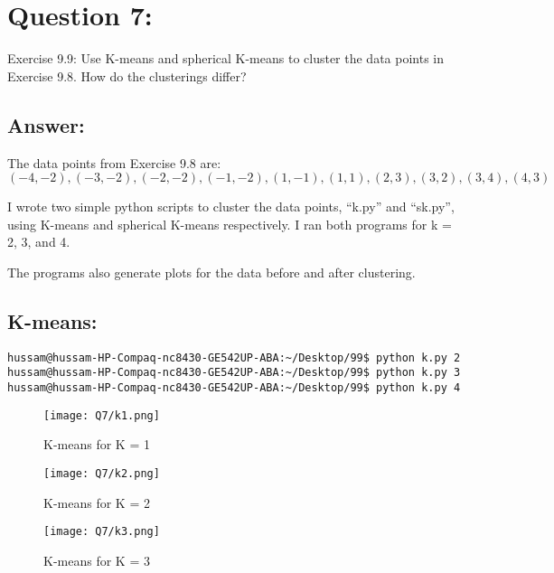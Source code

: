 \section*{Question 7:}
Exercise 9.9: Use K-means and spherical K-means to cluster the data points in Exercise 9.8. How do the clusterings differ?

\subsection*{Answer:}

The data points from Exercise 9.8 are:
$$(-4,-2),(-3,-2),(-2,-2),(-1,-2),(1,-1),(1,1),(2,3),(3,2),(3,4),(4,3)$$


I wrote two simple python scripts to cluster the data points, ``k.py'' and ``sk.py'', using K-means and spherical K-means respectively.
I ran both programs for k = 2, 3, and 4.

The programs also generate plots for the data before and after clustering.

\subsection{K-means:}



\begin{lstlisting}[breakatwhitespace=〈false)]
hussam@hussam-HP-Compaq-nc8430-GE542UP-ABA:~/Desktop/99$ python k.py 2
hussam@hussam-HP-Compaq-nc8430-GE542UP-ABA:~/Desktop/99$ python k.py 3
hussam@hussam-HP-Compaq-nc8430-GE542UP-ABA:~/Desktop/99$ python k.py 4
\end{lstlisting}

\begin{figure}[h]
\caption{K-means for K = 1}
\centering
\texttt{[image: Q7/k1.png]}
\end{figure}

\pagebreak

\begin{figure}[h]
\caption{K-means for K = 2}
\centering
\texttt{[image: Q7/k2.png]}
\end{figure}

\pagebreak

\begin{figure}[h]
\caption{K-means for K = 3}
\centering
\texttt{[image: Q7/k3.png]}
\end{figure}

